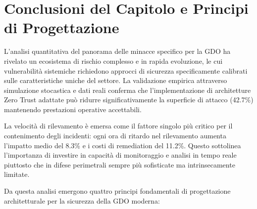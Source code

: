 \section{Conclusioni del Capitolo e Principi di Progettazione}

L'analisi quantitativa del panorama delle minacce specifico per la GDO ha rivelato un ecosistema di rischio complesso e in rapida evoluzione, le cui vulnerabilità sistemiche richiedono approcci di sicurezza specificamente calibrati sulle caratteristiche uniche del settore. La validazione empirica attraverso simulazione stocastica e dati reali conferma che l'implementazione di architetture Zero Trust adattate può ridurre significativamente la superficie di attacco (42.7\%) mantenendo prestazioni operative accettabili.

La velocità di rilevamento è emersa come il fattore singolo più critico per il contenimento degli incidenti: ogni ora di ritardo nel rilevamento aumenta l'impatto medio del 8.3\% e i costi di remediation del 11.2\%. Questo sottolinea l'importanza di investire in capacità di monitoraggio e analisi in tempo reale piuttosto che in difese perimetrali sempre più sofisticate ma intrinsecamente limitate.

Da questa analisi emergono quattro principi fondamentali di progettazione architetturale per la sicurezza della GDO moderna:

